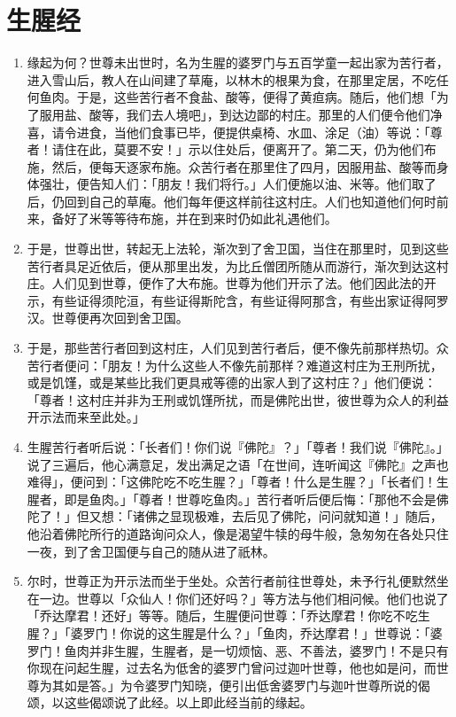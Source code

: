 \section{生腥经}

\begin{enumerate}\item 缘起为何？世尊未出世时，名为生腥的婆罗门与五百学童一起出家为苦行者，进入雪山后，教人在山间建了草庵，以林木的根果为食，在那里定居，不吃任何鱼肉。于是，这些苦行者不食盐、酸等，便得了黄疸病。随后，他们想「为了服用盐、酸等，我们去人境吧」，到达边鄙的村庄。那里的人们便令他们净喜，请令进食，当他们食事已毕，便提供桌椅、水皿、涂足（油）等说：「尊者！请住在此，莫要不安！」示以住处后，便离开了。第二天，仍为他们布施，然后，便每天逐家布施。众苦行者在那里住了四月，因服用盐、酸等而身体强壮，便告知人们：「朋友！我们将行。」人们便施以油、米等。他们取了后，仍回到自己的草庵。他们每年便这样前往这村庄。人们也知道他们何时前来，备好了米等等待布施，并在到来时仍如此礼遇他们。
\item 于是，世尊出世，转起无上法轮，渐次到了舍卫国，当住在那里时，见到这些苦行者具足近依后，便从那里出发，为比丘僧团所随从而游行，渐次到达这村庄。人们见到世尊，便作了大布施。世尊为他们开示了法。他们因此法的开示，有些证得须陀洹，有些证得斯陀含，有些证得阿那含，有些出家证得阿罗汉。世尊便再次回到舍卫国。
\item 于是，那些苦行者回到这村庄，人们见到苦行者后，便不像先前那样热切。众苦行者便问：「朋友！为什么这些人不像先前那样？难道这村庄为王刑所扰，或是饥馑，或是某些比我们更具戒等德的出家人到了这村庄？」他们便说：「尊者！这村庄并非为王刑或饥馑所扰，而是佛陀出世，彼世尊为众人的利益开示法而来至此处。」
\item 生腥苦行者听后说：「长者们！你们说『佛陀』？」「尊者！我们说『佛陀』。」说了三遍后，他心满意足，发出满足之语「在世间，连听闻这『佛陀』之声也难得」，便问到：「这佛陀吃不吃生腥？」「尊者！什么是生腥？」「长者们！生腥者，即是鱼肉。」「尊者！世尊吃鱼肉。」苦行者听后便后悔：「那他不会是佛陀了！」但又想：「诸佛之显现极难，去后见了佛陀，问问就知道！」随后，他沿着佛陀所行的道路询问众人，像是渴望牛犊的母牛般，急匆匆在各处只住一夜，到了舍卫国便与自己的随从进了祇林。
\item 尔时，世尊正为开示法而坐于坐处。众苦行者前往世尊处，未予行礼便默然坐在一边。世尊以「众仙人！你们还好吗？」等方法与他们相问候。他们也说了「乔达摩君！还好」等等。随后，生腥便问世尊：「乔达摩君！你吃不吃生腥？」「婆罗门！你说的这生腥是什么？」「鱼肉，乔达摩君！」世尊说：「婆罗门！鱼肉并非生腥，生腥者，是一切烦恼、恶、不善法，婆罗门！不是只有你现在问起生腥，过去名为低舍的婆罗门曾问过迦叶世尊，他也如是问，而世尊为其如是答。」为令婆罗门知晓，便引出低舍婆罗门与迦叶世尊所说的偈颂，以这些偈颂说了此经。以上即此经当前的缘起。

\end{enumerate}
